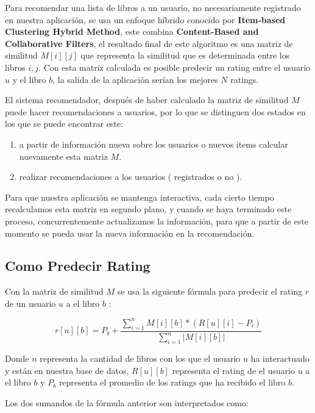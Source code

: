 \documentclass[14pt]{extarticle}
\begin{document}
Para recomendar una lista de libros a un usuario, no necesariamente registrado en nuestra aplicación, se usa un enfoque híbrido conocido por \textbf{Item-based Clustering Hybrid Method}, este combina \textbf{Content-Based and Collaborative Filters}, el resultado final de este algoritmo es una matriz de similitud $M[i][j]$ que representa la similitud que es determinada entre los libros $i, j$. Con esta matriz calculada es posible predecir un rating entre el usuario $u$ y el libro $b$, la salida de la aplicación serían los mejores $N$ ratings.   

El sistema recomendador, después de haber calculado la matriz de similitud $M$ puede hacer recomendaciones a usuarios, por lo que se distinguen dos estados en los que se puede encontrar este:

\begin{enumerate}
    \item a partir de información nueva sobre los usuarios o nuevos items calcular nuevamente esta matriz $M$.
    \item realizar recomendaciones a los usuarios ( registrados o no ).
\end{enumerate}

Para que nuestra aplicación se mantenga interactiva, cada cierto tiempo recalculamos esta matriz en segundo plano, y cuando se haya terminado este proceso, concurrentemente actualizamos la información, para que a partir de este momento se pueda usar la nueva información en la recomendación.


\subsection{Como Predecir Rating}  

Con la matriz de similitud $M$ se usa la siguiente fórmula para predecir el rating $r$ de un usuario $u$ a el libro $b$ :

$$r[u][b] = P_b + \frac{\sum_{i = 1}^n M[i][b]*(R[u][i] - P_i)}{\sum_{i = 1}^n | M[i][b] | }$$

Donde $n$ representa la cantidad de libros con los que el usuario $u$ ha interactuado y están en nuestra base de datos, $R[u][b]$ representa el rating de el usuario $u$ a el libro $b$ y $P_b$ representa el promedio de los ratings que ha recibido el libro $b$.

Los dos sumandos de la fórmula anterior son interpretados como:
\end{document}
